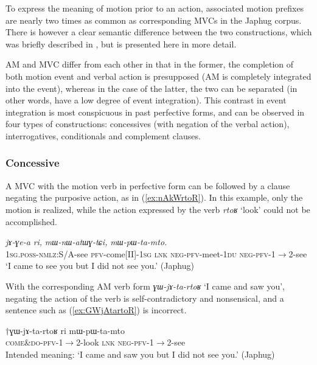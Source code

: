 \documentclass[oneside,a4paper,11pt]{article}
\newcommand{\ipa}[1]{{\phon\textit{#1}}}
\newcommand{\japhug}[2]{\textit{\phon#1} `#2'}
\newcommand{\fl}{$\rightarrow$}
\begin{document}
To express the meaning of motion prior to an action, associated motion prefixes are nearly two times as common as corresponding MVCs in the Japhug corpus. There is however a clear semantic difference between the two constructions, which was briefly described in \citet{jacques13harmonization}, but is presented here in more detail.

AM and MVC differ from each other in that in the former, the completion of both motion event and verbal action is presupposed (AM is completely integrated into the event), whereas in the case of the latter, the two can be separated (in other words, have a low degree of event integration). This contrast in event integration is most conspicuous in past perfective forms, and can be observed in four types of constructions: concessives (with negation of the verbal action), interrogatives, conditionals and complement clauses.

\subsubsection{Concessive} \label{sec:am.concessive}
A MVC  with the motion verb in perfective form can be followed by a clause negating the purposive action, as in (\ref{ex:nAkWrtoR}). In this example, only the motion is realized, while the action expressed by the verb \japhug{rtoʁ}{look} could not be accomplished.

\begin{exe}
\ex \label{ex:nAkWrtoR}
\gll \ipa{nɤ-kɯ-rtoʁ}	\ipa{jɤ-ɣe-a}	\ipa{ri,}	\ipa{mɯ-nɯ-atɯɣ-tɕi,}	\ipa{mɯ-pɯ-ta-mto.} \\
\textsc{1sg.poss}-\textsc{nmlz}:S/A-see \textsc{pfv}-come[II]-\textsc{1sg} \textsc{lnk} \textsc{neg}-\textsc{pfv}-meet-\textsc{1du} \textsc{neg}-\textsc{pfv}-1\fl2-see \\
\glt `I came to see you but I did not see you.' (Japhug)
\end{exe}

With the corresponding AM verb form \japhug{ɣɯ-jɤ-ta-rtoʁ}{I came and saw you}, negating the action of the verb is self-contradictory and nonsensical, and a sentence such as (\ref{ex:GWjAtartoR}) is incorrect.

\begin{exe}
\ex \label{ex:GWjAtartoR}
\gll $\dagger$ɣɯ-jɤ-ta-rtoʁ ri mɯ-pɯ-ta-mto \\
\textsc{come\&do}-\textsc{pfv}-1\fl2-look \textsc{lnk} \textsc{neg}-\textsc{pfv}-1\fl2-see \\
\glt Intended meaning: `I came and saw you but I did not see you.'  (Japhug)
\end{exe}
\end{document}
